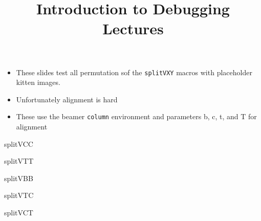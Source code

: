 \documentclass[11pt,compress,t,notes=noshow, xcolor=table]{beamer}
\title{Introduction to Debugging Lectures}
\begin{document}

\begin{frame}
  \begin{itemize}
    \item These slides test all permutation sof the \texttt{splitVXY} macros with placeholder kitten images.
    \item Unfortunately alignment is hard
    \item These use the beamer \texttt{column} environment and parameters b, c, t, and T for alignment
  \end{itemize}

\end{frame}

\begin{frame}{splitVCC}


\end{frame}

\begin{frame}{splitVTT}

  
\end{frame}

\begin{frame}{splitVBB}

  
\end{frame}

\begin{frame}{splitVTC}

  
\end{frame}

\begin{frame}{splitVCT}

  
\end{frame}
\end{document}
